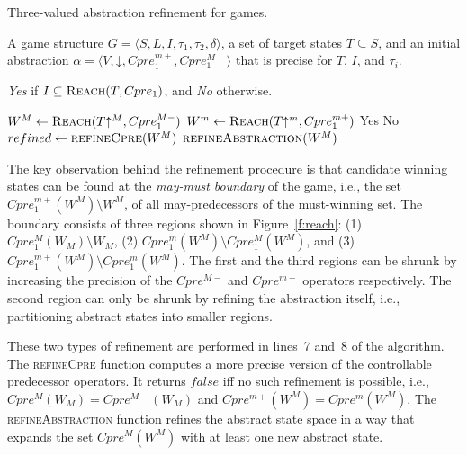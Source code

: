 \documentclass{article}
\newcommand{\reach}[0]{\textsc{Reach}}
\newcommand{\concrete}[1]{#1\mathord{\downarrow}}
\newcommand{\abstractm}[1]{#1\mathord{\uparrow^m}}
\newcommand{\abstractM}[1]{#1\mathord{\uparrow^M}}
\begin{document}
\begin{algorithm}[t]
\caption{Three-valued abstraction refinement for games.}
\label{alg:generic}

\begin{algorithmic}[1]

     A game structure $G = \langle S, L, I, \tau_1, \tau_2, \delta \rangle$, a set 
    of target states $T\subseteq S$, and an initial abstraction $\alpha=\langle V, \concrete{}, Cpre_1^{m+}, Cpre_1^{M-} \rangle$
    that is precise for $T$, $I$, and $\tau_i$.

     {\it Yes} if $I \subseteq \reach(T, Cpre_1)$, and {\it No} otherwise.

    \Loop
        \State $W^M \gets \reach(\abstractM{T}, Cpre_1^{M-})$
        \State $W^m \gets \reach(\abstractm{T}, Cpre_1^{m+})$
        \If{$\abstractM{I} \subseteq W^M$} 
            \State\Return Yes
        \ElsIf{$\abstractM{I} \nsubseteq W^m$} 
            \State\Return No
        \Else       
            \State $refined \gets \Call{refineCpre}{W^M}$
                \State$\Call{refineAbstraction}{W^M}$
            \EndIf
        \EndIf
    \EndLoop
\end{algorithmic}
\end{algorithm}

The key observation behind the refinement procedure is that 
candidate winning states can be found at the \emph{may-must 
boundary} of the game, i.e., the set $Cpre_1^{m+}(W^M)\setminus 
W^M$, of all may-predecessors of the must-winning set.  The 
boundary consists of three regions shown in Figure~\ref{f:reach}: 
(1) $Cpre_1^{M}(W_M)\setminus W_M$, (2) $Cpre_1^m(W^M)\setminus 
Cpre_1^{M}(W^M)$, and (3) $Cpre_1^{m+}(W^M)\setminus 
Cpre_1^{m}(W^M)$.  The first and the third regions can be shrunk 
by increasing the precision of the $Cpre^{M-}$ and $Cpre^{m+}$ 
operators respectively.  The second region can only be shrunk by 
refining the abstraction itself, i.e., partitioning abstract 
states into smaller regions.

These two types of refinement are performed in lines~7 and~8 of 
the algorithm.  The \textsc{refineCpre} function computes a more 
precise version of the controllable predecessor operators.  It 
returns $false$ iff no such refinement is possible, i.e., 
$Cpre^{M}(W_M)=Cpre^{M-}(W_M)$ and $Cpre^{m+}(W^M)=Cpre^{m}(W^M)$.  
The \textsc{refineAbstraction} function refines the abstract state 
space in a way that expands the set $Cpre^M(W^M)$ with at least 
one new abstract state.  
\end{document}
